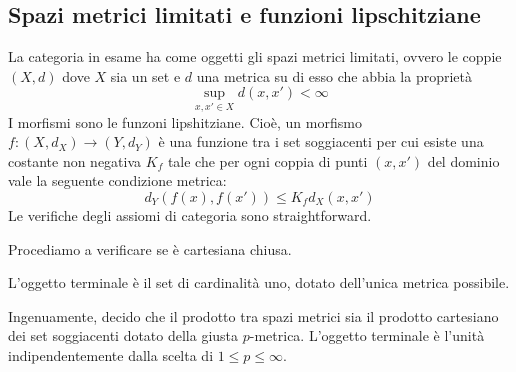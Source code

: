 \subsection*{Spazi metrici limitati e funzioni lipschitziane}

La categoria in esame ha come oggetti gli spazi metrici limitati, ovvero le coppie $(X,d)$ dove $X$ sia un set e $d$ una metrica su di esso che abbia la proprietà
\[\sup_{x,x'\in X}d(x,x')<\infty\]
I morfismi sono le funzoni lipshitziane. Cioè, un morfismo $f:(X,d_X)\rightarrow(Y,d_Y)$ è una funzione tra i set soggiacenti per cui esiste una costante non negativa $K_f$ tale che per ogni coppia di punti $(x,x')$ del dominio vale la seguente condizione metrica:
\[d_Y(f(x),f(x'))\leq K_fd_X(x,x')\]
Le verifiche degli assiomi di categoria sono straightforward.

\hypertarget{lipschitz-functor}{}
Procediamo a verificare se è cartesiana chiusa.


L'oggetto terminale è il set di cardinalità uno, dotato dell'unica metrica possibile.

Ingenuamente, decido che il prodotto tra spazi metrici sia il prodotto cartesiano dei set soggiacenti dotato della giusta $p$-metrica. L'oggetto terminale è l'unità indipendentemente dalla scelta di $1\leq p\leq \infty$.

